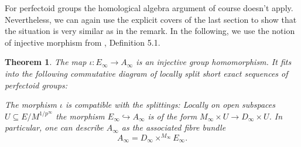 \documentclass[10pt,oneside]{amsart}
\newtheorem{theorem}{Theorem}[section]
\theoremstyle{definition}
\begin{document}
	For perfectoid groups the homological algebra argument of course doesn't apply. Nevertheless, we can again use the explicit covers of the last section to show that the situation is very similar as in the remark. In the following, we use the notion of injective morphism from \cite{etale_cohomology_of_diamonds}, Definition 5.1.
	\begin{theorem}\label{the morphism E->A in the limit}
		The map $\iota:E_\infty \rightarrow A_\infty$ is an injective group homomorphism. It fits into the following commutative diagram of locally split short exact sequences of perfectoid groups:
		\begin{center}
		\end{center}
		The morphism $\iota$ is compatible with the splittings: Locally on open subspaces $U\subseteq E/M^{1/p^\infty}$ the morphism $E_\infty\hookrightarrow A_\infty$ is of the form $M_\infty\times U\rightarrow D_\infty \times U$.	In particular, one can describe $A_\infty$ as the associated fibre bundle
		\[A_\infty = D_\infty\times^{M_\infty}E_\infty.\]
	\end{theorem}
\end{document}
